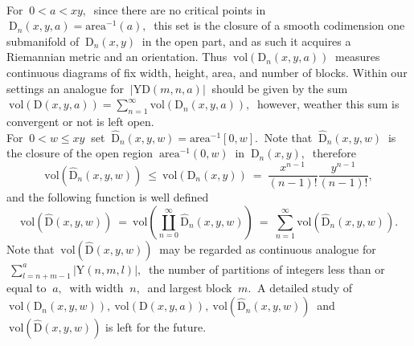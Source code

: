 \documentclass[10pt,leqeq]{article}
\begin{document}
\

For $\ 0< a < xy,\ $ since there are no critical points in 
$\ \mathrm{D}_n(x,y,a) = \mathrm{area}^{-1}(a),\ $ this set is the closure of a smooth codimension one submanifold of  $ \ \mathrm{D}_n(x,y)\ $ in the open part, and as such it acquires a Riemannian metric and an orientation.
Thus $ \  \mathrm{vol}(\mathrm{D}_n(x,y,a))\ $ measures continuous diagrams of fix width, height, area, and number of blocks. Within  our settings an analogue for $ \  |\mathrm{YD}(m,n,a)| \ $ should be given by the sum 
$\ \displaystyle  \mathrm{vol}(\mathrm{D}(x,y,a))  =  \sum_{n=1}^{\infty} \mathrm{vol}(\mathrm{D}_n(x,y,a)), \ $ however, weather this sum is convergent or not is left open.\\


For $\ 0 < w \leq xy\ $ set  $\ \widehat{\mathrm{D}}_n(x,y,w) = \mathrm{area}^{-1}[0,w].\ $ Note that $\ \widehat{\mathrm{D}}_n(x,y,w) \ $ is 
the closure of the  open region $\ \mathrm{area}^{-1}(0,w) \ $ in $\ \mathrm{D}_n(x,y), \ $ therefore
$$\mathrm{vol}(\widehat{\mathrm{D}}_n(x,y,w))  \ \leq \  \mathrm{vol}(\mathrm{D}_n(x,y)) \ = \ \frac{x^{n-1}}{(n-1)!}\frac{y^{n-1}}{(n-1)!}, $$ and the following function is well defined
$$\mathrm{vol}(\widehat{\mathrm{D}}(x,y,w)) \ = \ \mathrm{vol}(\coprod_{n=0}^{\infty}\widehat{\mathrm{D}}_n(x,y,w)) \ = \ 
\sum_{n=1}^{\infty}\mathrm{vol}(\widehat{\mathrm{D}}_n(x,y,w)).$$
Note that  $\ \mathrm{vol}(\widehat{\mathrm{D}}(x,y,w)) \ $ may be regarded as continuous analogue for $\ \sum_{l=n+m-1}^{a}\big|\mathrm{Y}(n,m,l)\big|, \  $ the number of partitions of integers less than or equal to $\ a, \ $ with width $\ n,\ $ and largest block $\ m. \ $ 
A detailed study of  $\ \mathrm{vol}(\mathrm{D}_n(x,y,w)), \ \mathrm{vol}(\mathrm{D}(x,y,a)), \   \mathrm{vol}(\widehat{\mathrm{D}}_n(x,y,w)) \ $ and $\ \mathrm{vol}(\widehat{\mathrm{D}}(x,y,w)) $ is left for the future.

\
\end{document}
